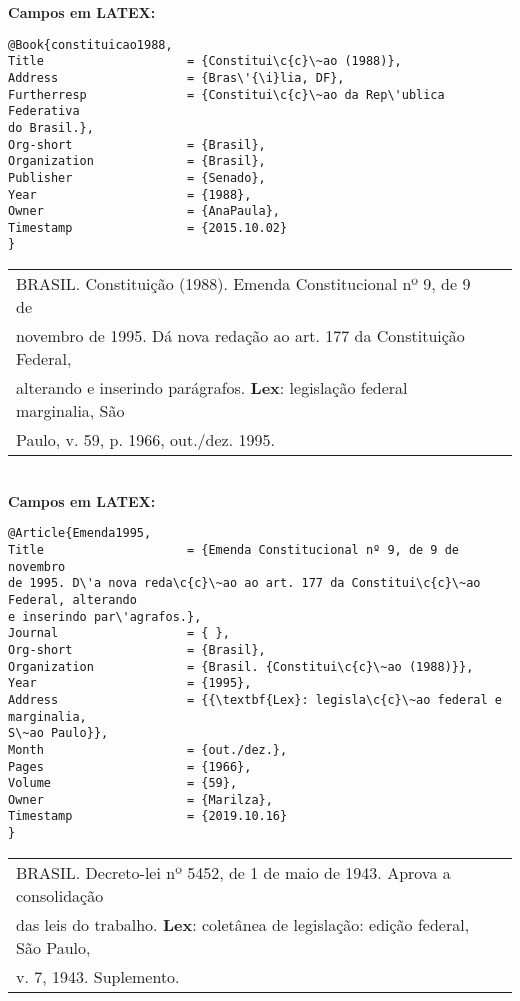 \textbf{Campos em LATEX:} 

\begin{verbatim}
@Book{constituicao1988,
Title                    = {Constitui\c{c}\~ao (1988)},
Address                  = {Bras\'{\i}lia, DF},
Furtherresp              = {Constitui\c{c}\~ao da Rep\'ublica Federativa 
do Brasil.},
Org-short                = {Brasil},
Organization             = {Brasil},
Publisher                = {Senado},
Year                     = {1988},
Owner                    = {AnaPaula},
Timestamp                = {2015.10.02}
}
\end{verbatim}

\begin{tabular}{|l|c|} \hline
	BRASIL. Constitui\c{c}\~ao (1988). Emenda Constitucional 
	nº 9, de 9 de \\novembro de 1995. D\'a nova reda\c{c}\~ao ao art. 177 da Constitui\c{c}\~ao
	Federal,\\ alterando e inserindo par\'agrafos. \textbf{Lex}: legisla\c{c}\~ao federal marginalia, S\~ao \\ Paulo, v. 59, p. 1966, out./dez. 1995.  
	\\\hline
\end{tabular} \\

\textbf{Campos em LATEX:} \\

\begin{verbatim}
@Article{Emenda1995,
Title                    = {Emenda Constitucional nº 9, de 9 de novembro 
de 1995. D\'a nova reda\c{c}\~ao ao art. 177 da Constitui\c{c}\~ao Federal, alterando 
e inserindo par\'agrafos.},
Journal                  = { },
Org-short                = {Brasil},
Organization             = {Brasil. {Constitui\c{c}\~ao (1988)}},
Year                     = {1995},
Address                  = {{\textbf{Lex}: legisla\c{c}\~ao federal e marginalia, 
S\~ao Paulo}},
Month                    = {out./dez.},
Pages                    = {1966},
Volume                   = {59},
Owner                    = {Marilza},
Timestamp                = {2019.10.16}
}
\end{verbatim}

\begin{tabular}{|l|c|} \hline
	BRASIL. Decreto-lei nº 5452, de 1 de maio de 1943. Aprova a consolida\c{c}\~ao \\ das leis do trabalho. \textbf{Lex}: colet\^anea de legisla\c{c}\~ao: edi\c{c}\~ao federal, S\~ao Paulo, \\ v. 7, 1943. Suplemento.
	\\\hline
\end{tabular} \\

